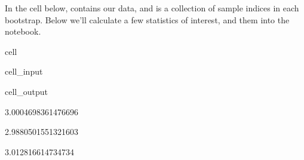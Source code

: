\documentclass[letterpaper,10pt,english]{jupyterBook}
\begin{document}
\sphinxAtStartPar
In the cell below,  contains our data, and  is a collection of sample indices in each bootstrap. Below we’ll calculate a few statistics of interest, and
 them into the notebook.

\begin{sphinxuseclass}{cell}\begin{sphinxVerbatimInput}

\begin{sphinxuseclass}{cell_input}
\begin{sphinxVerbatim}[commandchars=\\\{\}]
  \PYG{p}{[}\PYG{p}{]}
    \PYG{p}{[} \PYG{p}{]}

 
 
 
\end{sphinxVerbatim}

\end{sphinxuseclass}\end{sphinxVerbatimInput}
\begin{sphinxVerbatimOutput}

\begin{sphinxuseclass}{cell_output}
\begin{sphinxVerbatim}[commandchars=\\\{\}]
3.0004698361476696
\end{sphinxVerbatim}

\begin{sphinxVerbatim}[commandchars=\\\{\}]
2.9880501551321603
\end{sphinxVerbatim}

\begin{sphinxVerbatim}[commandchars=\\\{\}]
3.012816614734734
\end{sphinxVerbatim}

\end{sphinxuseclass}\end{sphinxVerbatimOutput}

\end{sphinxuseclass}
\end{document}
